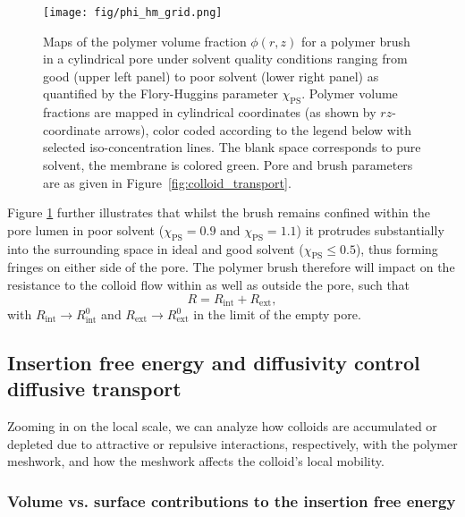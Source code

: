\documentclass[12pt, a4paper]{article}
\begin{document}
\begin{figure}
    \centering
    \texttt{[image: fig/phi\_hm\_grid.png]}
    \caption{
    Maps of the polymer volume fraction $\phi(r,z)$ for a polymer brush in a cylindrical pore under solvent quality conditions ranging from good (upper left panel) to poor solvent (lower right panel) as quantified by the Flory-Huggins parameter $\chi_{\text{PS}}$.
    Polymer volume fractions are mapped in cylindrical coordinates (as shown by $rz$-coordinate arrows), color coded according to the legend below with selected iso-concentration lines. The blank space corresponds to pure solvent, the membrane is colored green.
    Pore and brush parameters are as given in Figure~\ref{fig:colloid_transport}.
    }
    \label{fig:phi_hm_grid}
\end{figure}

Figure \ref{fig:phi_hm_grid} further illustrates that whilst the brush remains confined within the pore lumen in poor solvent ($\chi_{\text{PS}}=0.9$ and $\chi_{\text{PS}}=1.1$) it protrudes substantially into the surrounding space in ideal and good solvent ($\chi_{\text{PS}}\le0.5$), thus forming fringes on either side of the pore.
The polymer brush therefore will impact on the resistance to the colloid flow within as well as outside the pore, such that
\begin{equation}
    R=R_{\text{int}}+R_{\text{ext}},
    \label{eq:R_tot_tot}
\end{equation}
with $R_{\text{int}}\rightarrow R_{\text{int}}^{0}$ and $R_{\text{ext}}\rightarrow R_{\text{ext}}^{0}$ in the limit of the empty pore.


\subsection{Insertion free energy and diffusivity control diffusive transport}

Zooming in on the local scale, we can analyze how colloids are accumulated or depleted due to attractive or repulsive interactions, respectively, with the polymer meshwork, and how the meshwork affects the colloid's local mobility.


\subsubsection{Volume vs. surface contributions to the insertion free energy}
\end{document}
